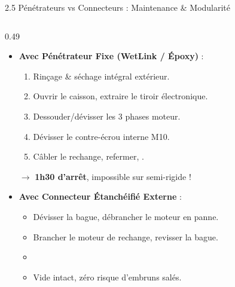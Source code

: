 \begin{frame}{2.5 Pénétrateurs vs Connecteurs : Maintenance \& Modularité}
  \begin{columns}[T]
    \begin{column}{0.49\textwidth}
      \begin{block}{}
        \scriptsize
        \begin{itemize}
          \item \textbf{Avec Pénétrateur Fixe (WetLink / Époxy)} :
            \begin{enumerate}\tiny
              \item Rinçage \& séchage intégral extérieur.
              \item Ouvrir le caisson, extraire le tiroir électronique.
              \item Dessouder/dévisser les 3 phases moteur.
              \item Dévisser le contre-écrou interne M10.
              \item Câbler le rechange, refermer, .
            \end{enumerate}
            $\rightarrow$ \textbf{1h30 d'arrêt}, impossible sur semi-rigide !
          \item \textbf{Avec Connecteur Étanchéifié Externe} :
            \begin{itemize}\tiny
              \item Dévisser la bague, débrancher le moteur en panne.
              \item Brancher le moteur de rechange, revisser la bague.
              \item {}
              \item Vide intact, zéro risque d'embruns salés.
            \end{itemize}
        \end{itemize}
      \end{block}
    \end{column}


\end{columns}
\end{frame}
